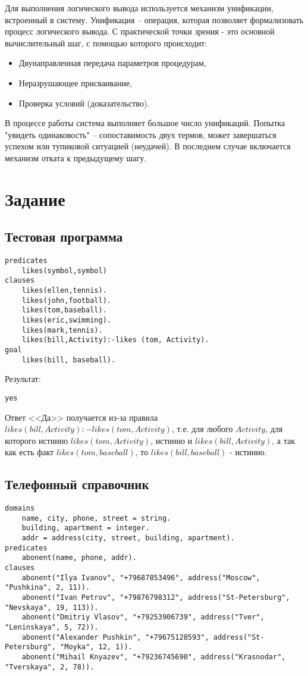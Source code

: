 \documentclass[a4paper,12pt]{article}
\begin{document}
Для выполнения логического вывода используется механизм унификации, встроенный в систему.
Унификация – операция, которая позволяет формализовать процесс логического вывода. С практической точки зрения  - это основной вычислительный шаг, с помощью которого происходит:
\begin{itemize}
	\item Двунаправленная передача параметров процедурам,
	\item Неразрушающее присваивание,
	\item Проверка условий (доказательство).
\end{itemize}

В процессе работы система выполняет большое число унификаций.  Попытка "увидеть одинаковость" – сопоставимость двух термов, может завершаться успехом или тупиковой ситуацией (неудачей). В последнем случае включается механизм отката к предыдущему шагу.

\section*{Задание}

\subsection*{Тестовая программа}

\begin{lstlisting}[caption=Тестовая программа]
predicates
	likes(symbol,symbol)
clauses
	likes(ellen,tennis).
	likes(john,football).
	likes(tom,baseball).
	likes(eric,swimming).
	likes(mark,tennis). 
	likes(bill,Activity):-likes (tom, Activity).
goal
	likes(bill, baseball).
\end{lstlisting}

Результат:
\begin{lstlisting}
yes
\end{lstlisting}

Ответ <<Да>> получается из-за правила $likes(bill,Activity) :- likes(tom, Activity)$, т.е. для любого $Activity$, для которого истинно $likes(tom, Activity)$, истинно и $likes(bill,Activity)$, а так как есть факт $likes(tom,baseball)$, то $likes(bill, baseball)$ - истинно.

\subsection*{Телефонный справочник}
\begin{lstlisting}[caption=Телефонный справочник]
domains 
	name, city, phone, street = string. 
	building, apartment = integer. 
	addr = address(city, street, building, apartment). 
predicates 
	abonent(name, phone, addr). 
clauses 
	abonent("Ilya Ivanov", "+79687853496", address("Moscow", "Pushkina", 2, 11)). 
	abonent("Ivan Petrov", "+79876798312", address("St-Petersburg", "Nevskaya", 19, 113)). 
	abonent("Dmitriy Vlasov", "+79253906739", address("Tver", "Leninskaya", 5, 72)). 
	abonent("Alexander Pushkin", "+79675128593", address("St-Petersburg", "Moyka", 12, 1)). 
	abonent("Mihail Knyazev", "+79236745690", address("Krasnodar", "Tverskaya", 2, 78)). 
\end{lstlisting}
\end{document}

